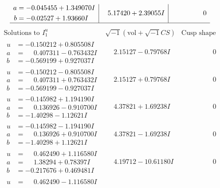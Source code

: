 \documentclass[1p]{elsarticle_modified}
\theoremstyle{definition}
\newcommand{\I}{\sqrt{-1}}
\begin{document}
$$\begin{array}{c|c|c}
\begin{aligned}
a &= -0.045455 + 1.349070 I \\
b &= -0.02527 + 1.93660 I\end{aligned}
 & \phantom{-}5.17420 + 2.39055 I & \phantom{-0.000000 } 0\\
 \hline 
 \end{array}$$\newpage$$\begin{array}{c|c|c}  
\text{Solutions to }I^u_{1}& \I (\text{vol} + \sqrt{-1}CS) & \text{Cusp shape}\\
 \hline 
\begin{aligned}
u &= -0.150212 + 0.805508 I \\
a &= \phantom{-}0.407311 - 0.763432 I \\
b &= -0.569199 + 0.927037 I\end{aligned}
 & \phantom{-}2.15127 - 0.79768 I & \phantom{-0.000000 } 0 \\ \hline\begin{aligned}
u &= -0.150212 - 0.805508 I \\
a &= \phantom{-}0.407311 + 0.763432 I \\
b &= -0.569199 - 0.927037 I\end{aligned}
 & \phantom{-}2.15127 + 0.79768 I & \phantom{-0.000000 } 0 \\ \hline\begin{aligned}
u &= -0.145982 + 1.194190 I \\
a &= \phantom{-}0.136926 - 0.910700 I \\
b &= -1.40298 - 1.12621 I\end{aligned}
 & \phantom{-}4.37821 + 1.69238 I & \phantom{-0.000000 } 0 \\ \hline\begin{aligned}
u &= -0.145982 - 1.194190 I \\
a &= \phantom{-}0.136926 + 0.910700 I \\
b &= -1.40298 + 1.12621 I\end{aligned}
 & \phantom{-}4.37821 - 1.69238 I & \phantom{-0.000000 } 0 \\ \hline\begin{aligned}
u &= \phantom{-}0.462490 + 1.116580 I \\
a &= \phantom{-}1.38294 + 0.78397 I \\
b &= -0.217676 + 0.469481 I\end{aligned}
 & \phantom{-}4.19712 - 10.61180 I & \phantom{-0.000000 } 0 \\ \hline\begin{aligned}
u &= \phantom{-}0.462490 - 1.116580 I \\

\end{aligned}
\end{array}$$
\end{document}

